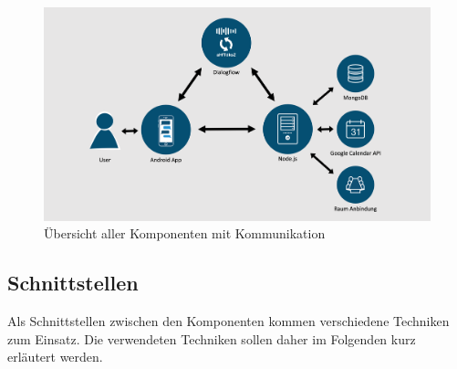 \begin{figure}[htb]
    \centering
    \includegraphics[width=1\textwidth]{bilder/Komponenten-v3.png}
    \caption{Übersicht aller Komponenten mit Kommunikation}
    \label{fig:komponenten-v3}
\end{figure}

\subsection{Schnittstellen}
\label{subsec:Schnittstellen-Konzeption}

Als Schnittstellen zwischen den Komponenten kommen verschiedene Techniken zum Einsatz. Die verwendeten Techniken sollen daher im Folgenden kurz erläutert \mbox{werden}. 

